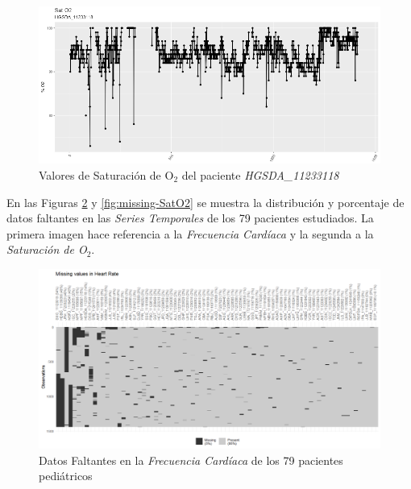 \begin{figure}[H]
    \centering
    \includegraphics[scale=0.85]{./img/SatO2-HGSDA.png}
    \caption{Valores de Saturación de O$_2$ del paciente \textit{HGSDA\_11233118}}
    \label{fig:satO2-HGSDA}
\end{figure}


En las Figuras \ref{fig:missing-FC} y \ref{fig:missing-SatO2} se muestra la distribución y porcentaje de datos faltantes en las \textit{Series Temporales} de los 79 pacientes estudiados. La primera imagen hace referencia a la \textit{Frecuencia Cardíaca} y la segunda a la \textit{Saturación de O$_2$}.

\newpage
\thispagestyle{empty}

\begin{landscape}

    \begin{figure}[H]
        \centering
        \includegraphics[scale = 0.9]{./img/missing-data-HR.png}
        \caption{Datos Faltantes en la \textit{Frecuencia Cardíaca} de los 79 pacientes pediátricos}
        \label{fig:missing-FC}
    \end{figure}
    
\end{landscape}
\restoregeometry 

